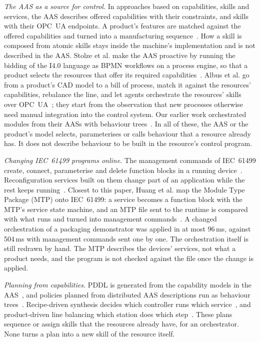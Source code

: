 \emph{The AAS as a source for control.} In approaches based on capabilities, skills and services, the
AAS describes offered capabilities with their constraints, and skills with their OPC~UA endpoints. A
product's features are matched against the offered capabilities and turned into a manufacturing
sequence~\cite{blumhofer2025enhancing}. How a skill is composed from atomic skills stays inside the
machine's implementation and is not described in the AAS. Stolze et al. make the AAS proactive by
running the bidding of the I4.0 language as BPMN workflows on a process engine, so that a product
selects the resources that offer its required capabilities~\cite{stolze2024proactive}. Albus et al. go
from a product's CAD model to
a bill of process, match it against the resources' capabilities, rebalance the line, and let agents
orchestrate the resources' skills over OPC~UA~\cite{albus2025automated}; they start from the
observation that new processes otherwise need manual integration into the control system. Our earlier
work orchestrated modules from their AASs with behaviour trees~\cite{jensen2026service}. In all of
these, the AAS or the product's model selects, parameterises or calls behaviour that a resource
already has. It does not describe behaviour to be built in the resource's control program.

\emph{Changing IEC~61499 programs online.} The management commands of IEC~61499 create, connect,
parameterise and delete function blocks in a running device~\cite{iec61499}. Reconfiguration services
built on them change part of an application while the rest keeps running~\cite{rooker2007zero}.
Closest to this paper, Huang et al. map the Module Type Package (MTP) onto IEC~61499: a service becomes
a function block with the MTP's service state machine, and an MTP file sent to the runtime is compared
with what runs and turned into management commands~\cite{huang2026plug}. A changed orchestration of a
packaging demonstrator was applied in at most 96\,ms, against 504\,ms with management commands sent one
by one. The orchestration itself is still redrawn by hand. The MTP describes the devices' services, not
what a product needs, and the program is not checked against the file once the change is applied.

\emph{Planning from capabilities.} PDDL is generated from the capability models in the
AAS~\cite{nabizada2026capability}, and policies planned from distributed AAS descriptions run as
behaviour trees~\cite{schwoerer2026fond}. Recipe-driven synthesis decides which controller runs which
service~\cite{terzimehic2021service}, and product-driven line balancing which station does which
step~\cite{albus2025automated}. These plans sequence or assign skills that the resources already
have, for an orchestrator. None turns a plan into a new skill of the resource itself.

